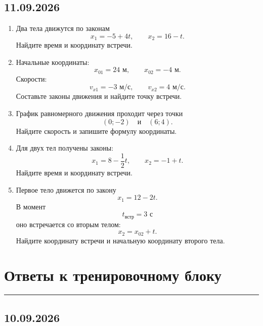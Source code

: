 \documentclass[a4paper,12pt]{article}
\newcommand{\sectionline}{%
    \vspace{-0.4em}
    {\color{accent}\rule{\linewidth}{0.7pt}}
    \vspace{0.4em}
}
\begin{document}
\vspace{6mm}

\subsection*{\color{darkaccent}11.09.2026}

\begin{enumerate}
    \item Два тела движутся по законам
    \[
    x_1=-5+4t,
    \qquad
    x_2=16-t.
    \]
    Найдите время и координату встречи.

    \item Начальные координаты:
    \[
    x_{01}=24\text{ м},
    \qquad
    x_{02}=-4\text{ м}.
    \]
    Скорости:
    \[
    v_{x1}=-3\text{ м/с},
    \qquad
    v_{x2}=4\text{ м/с}.
    \]
    Составьте законы движения и найдите точку встречи.

    \item График равномерного движения проходит через точки
    \[
    (0;-2)
    \quad\text{и}\quad
    (6;4).
    \]
    Найдите скорость и запишите формулу координаты.

    \item Для двух тел получены законы:
    \[
    x_1=8-\frac12t,
    \qquad
    x_2=-1+t.
    \]
    Найдите время и координату встречи.

    \item Первое тело движется по закону
    \[
    x_1=12-2t.
    \]
    В момент
    \[
    t_{\text{встр}}=3\text{ с}
    \]
    оно встречается со вторым телом:
    \[
    x_2=x_{02}+t.
    \]
    Найдите координату встречи и начальную координату второго тела.
\end{enumerate}


\clearpage

\section*{\color{darkaccent}Ответы к тренировочному блоку}
\sectionline

\subsection*{\color{darkaccent}10.09.2026}
\end{document}
